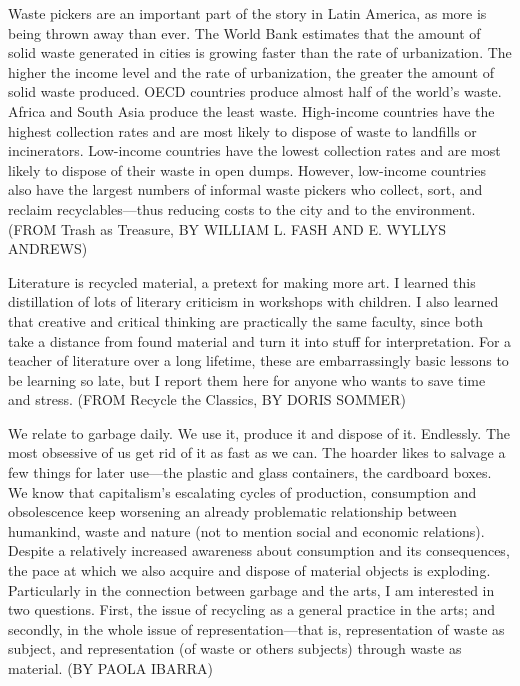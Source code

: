 \documentclass[12pt]{article}
\begin{document}
Waste pickers are an important part of the story in Latin America, as more is being thrown away than ever. The World Bank estimates that the amount of solid waste generated in cities is growing faster than the rate of urbanization. The higher the income level and the rate of urbanization, the greater the amount of solid waste produced. OECD countries produce almost half of the world’s waste. Africa and South Asia produce the least waste. High-income countries have the highest collection rates and are most likely to dispose of waste to landfills or incinerators. Low-income countries have the lowest collection rates and are most likely to dispose of their waste in open dumps. However, low-income countries also have the largest numbers of informal waste pickers who collect, sort, and reclaim recyclables---thus reducing costs to the city and to the environment. (FROM Trash as Treasure, BY WILLIAM L. FASH AND E. WYLLYS ANDREWS)

Literature is recycled material, a pretext for making more art. I learned this distillation of lots of literary criticism in workshops with children. I also learned that creative and critical thinking are practically the same faculty, since both take a distance from found material and turn it into stuff for interpretation. For a teacher of literature over a long lifetime, these are embarrassingly basic lessons to be learning so late, but I report them here for anyone who wants to save time and stress. (FROM Recycle the Classics, BY DORIS SOMMER)

We relate to garbage daily. We use it, produce it and dispose of it. Endlessly. The most obsessive of us get rid of it as fast as we can. The hoarder likes to salvage a few things for later use---the plastic and glass containers, the cardboard boxes. We know that capitalism’s escalating cycles of production, consumption and obsolescence keep worsening an already problematic relationship between humankind, waste and nature (not to mention social and economic relations). Despite a relatively increased awareness about consumption and its consequences, the pace at which we also acquire and dispose of material objects is exploding. Particularly in the connection between
garbage and the arts, I am interested in two questions. First, the issue of recycling as a general practice in the arts; and secondly, in the whole issue of representation---that is, representation of waste as subject, and representation (of waste or others subjects) through waste as material. (BY PAOLA IBARRA)
\end{document}
